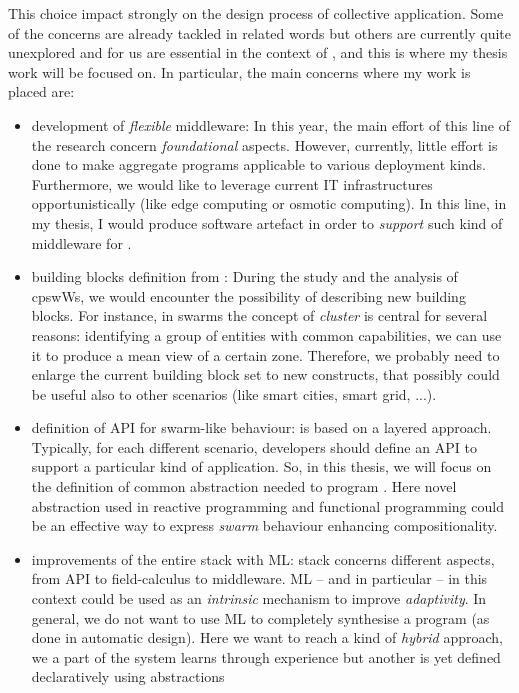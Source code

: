 \documentclass[11pt]{article}
\begin{document}
This choice impact strongly on the design process of collective application. Some of the concerns are already tackled in related words but others are currently quite unexplored and for us are essential in the context of \cpsw{}, and this is where my thesis work will be focused on.
In particular, the main concerns where my work is placed are:
\begin{itemize}
	\item development of \textit{flexible} middleware: In this year, the main effort of this line of the research concern \textit{foundational} aspects. However, currently, little effort is done to make aggregate programs applicable to various deployment kinds. Furthermore, we would like to leverage current IT infrastructures opportunistically (like edge computing or osmotic computing). In this line, in my thesis, I would produce software artefact in order to \textit{support} such kind of middleware for \cpsw{}.
	\item building blocks definition from \cpsw{}: During the study and the analysis of cpswWs, we would encounter the possibility of describing new building blocks. For instance, in swarms the concept of \emph{cluster} is central for several reasons: identifying a group of entities with common capabilities, we can use it to produce a mean view of a certain zone. Therefore, we probably need to enlarge the current building block set to new constructs, that possibly could be useful also to other scenarios (like smart cities, smart grid, ...).
	\item definition of API for swarm-like behaviour: \ac{} is based on a layered approach. Typically, for each different scenario, developers should define an API to support a particular kind of application. So, in this thesis, we will focus on the definition of common abstraction needed to program \cpsw{}. Here novel abstraction used in reactive programming and functional programming could be an effective way to express \textit{swarm} behaviour enhancing compositionality.
	\item improvements of the entire \ac{} stack with ML: \ac{} stack concerns different aspects, from API to field-calculus to middleware. ML -- and in particular \rl{} -- in this context could be used as an \emph{intrinsic} mechanism to improve \emph{adaptivity}. In general, we do not want to use ML to completely synthesise a program (as done in automatic design). Here we want to reach a kind of \textit{hybrid} approach, we a part of the system learns through experience but another is yet defined declaratively using \ac{} abstractions
\end{itemize}
\end{document}
